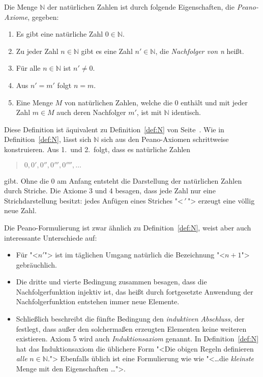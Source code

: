 \begin{definition} \label{def:peano}
Die Menge $\mathbb{N}$ der natürlichen Zahlen ist durch folgende
Eigenschaften, die \textit{Peano-Axiome}, gegeben:
\begin{enumerate}
\item Es gibt eine natürliche Zahl $0 \in \mathbb{N}$.
\item Zu jeder Zahl $n \in \mathbb{N}$ gibt es eine Zahl $n' \in \mathbb{N}$, die
      \emph{Nachfolger von n} heißt.
\item Für alle $n \in \mathbb{N}$ ist $n' \not = 0$.
\item Aus $n' = m'$ folgt $n=m$.
\item Eine Menge $M$ von natürlichen Zahlen, welche die $0$ enthält und mit jeder
      Zahl $m \in M$ auch deren Nachfolger $m'$, ist mit $\mathbb{N}$ identisch.
\end{enumerate}
\end{definition}
%
Diese Definition ist äquivalent zu Definition~\ref{def:N} von
Seite~\pageref{def:N}.  Wie in Definition~\ref{def:N}, lässt sich
$\mathbb{N}$ sich aus den Peano-Axiomen schrittweise konstruieren.
Aus 1.\ und 2.\ folgt, dass es natürliche Zahlen
\begin{quote}
  $0, 0', 0'', 0''', 0'''',\ldots$
\end{quote}
gibt.  Ohne die $0$ am Anfang entsteht die Darstellung der natürlichen Zahlen
durch Striche.  Die Axiome 3 und 4 besagen, dass jede Zahl nur eine Strichdarstellung 
besitzt: jedes Anfügen eines Striches "<$\,'\,$"> erzeugt eine
völlig neue Zahl.

Die Peano-Formulierung ist zwar ähnlich zu Definition~\ref{def:N},
weist aber auch interessante Unterschiede auf:
%
\begin{itemize}
\item Für "<$n'$"> ist im täglichen Umgang natürlich die Bezeichnung
  "<$n+1$"> gebräuchlich.
\item Die dritte und vierte Bedingung zusammen besagen, dass die
  Nachfolgerfunktion injektiv ist, das heißt durch fortgesetzte Anwendung
  der Nachfolgerfunktion entstehen immer neue Elemente.
\item Schließlich beschreibt die fünfte Bedingung den
  \textit{induktiven Abschluss}, der
  festlegt, dass außer den solchermaßen erzeugten Elementen keine
  weiteren existieren.  Axiom 5 wird auch \emph{Induktionsaxiom}
   genannt.  In Definition~\ref{def:N} hat das
  Induktionsaxiom die üblichere Form "<Die obigen Regeln definieren
  \emph{alle} $n\in\mathbb{N}$.">  Ebenfalls üblich ist eine
  Formulierung wie wie "<\ldots die \emph{kleinste} Menge
  mit den Eigenschaften \ldots">.
\end{itemize}
%

